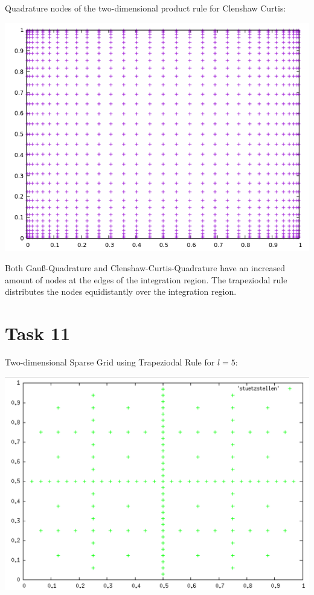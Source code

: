 \documentclass[10pt,a4paper]{article}
\begin{document}
Quadrature nodes of the two-dimensional product rule for Clenshaw Curtis:
\begin{center}
\includegraphics[scale=0.5]{quadrature_nodes_clenshaw_curtis.png}		
\end{center}

Both Gauß-Quadrature and Clenshaw-Curtis-Quadrature have an increased amount of nodes at the edges of the integration region. The trapeziodal rule distributes the nodes equidistantly over the integration region.

\section*{Task 11}

Two-dimensional Sparse Grid using Trapeziodal Rule for $l=5$:
\begin{center}
\includegraphics[scale=0.5]{sparse_grid_l5.png}	
\end{center}
\end{document}
